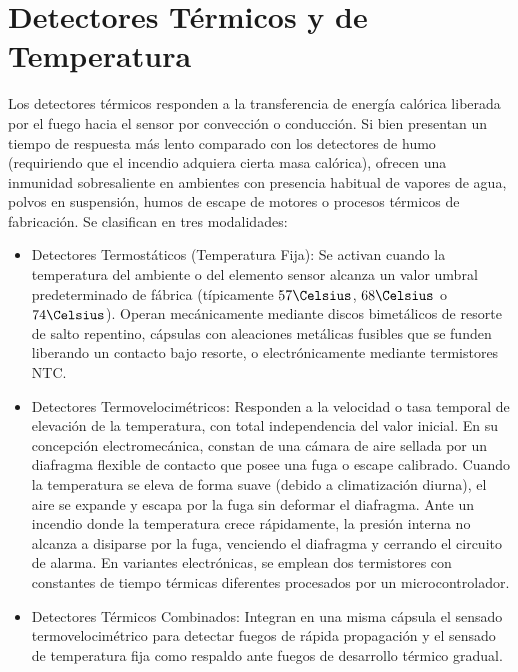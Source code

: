 \section{Detectores Térmicos y de Temperatura}

Los detectores térmicos responden a la transferencia de energía calórica liberada por el fuego hacia el sensor por
convección o conducción. Si bien presentan un tiempo de respuesta más lento comparado con los detectores de humo
(requiriendo que el incendio adquiera cierta masa calórica), ofrecen una inmunidad sobresaliente en ambientes con presencia
habitual de vapores de agua, polvos en suspensión, humos de escape de motores o procesos térmicos de fabricación. Se
clasifican en tres modalidades:

\begin{itemize}
    \item Detectores Termostáticos (Temperatura Fija): Se activan cuando la temperatura del ambiente o del elemento
          sensor alcanza un valor umbral predeterminado de fábrica (típicamente $57\Celsius$, $68\Celsius$ o $74\Celsius$).
          Operan mecánicamente mediante discos bimetálicos de resorte de salto repentino, cápsulas con aleaciones metálicas
          fusibles que se funden liberando un contacto bajo resorte, o electrónicamente mediante termistores NTC.
    \item Detectores Termovelocimétricos: Responden a la velocidad o tasa temporal de elevación de
          la temperatura, con total independencia del valor inicial. En su concepción electromecánica, constan de una cámara
          de aire sellada por un diafragma flexible de contacto que posee una fuga o escape calibrado. Cuando la temperatura
          se eleva de forma suave (debido a climatización diurna), el aire se expande y escapa por la fuga sin deformar el
          diafragma. Ante un incendio donde la temperatura crece rápidamente, la presión interna no alcanza a disiparse
          por la fuga, venciendo el diafragma y cerrando el circuito de alarma. En variantes electrónicas, se emplean
          dos termistores con constantes de tiempo térmicas diferentes procesados por un microcontrolador.
    \item Detectores Térmicos Combinados: Integran en una misma cápsula el sensado termovelocimétrico para detectar fuegos
          de rápida propagación y el sensado de temperatura fija como respaldo ante fuegos de desarrollo térmico gradual.
\end{itemize}


